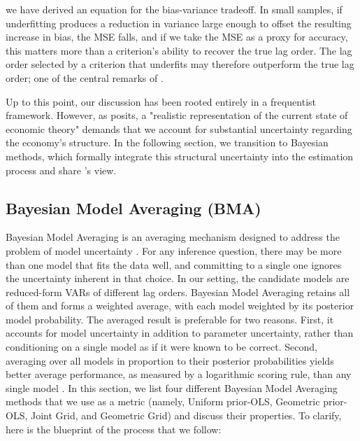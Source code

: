 \documentclass[12pt, a4paper]{article}
\begin{document}
we have derived an equation for the bias-variance tradeoff. In small samples, if underfitting produces a reduction in variance large enough to offset the resulting increase in bias, the MSE falls, and if we take the MSE as a proxy for accuracy, this matters more than a criterion's ability to recover the true lag order. The lag order selected by a criterion that underfits may therefore outperform the true lag order; one of the central remarks of \citet{ivanovPractitionersGuideLag2005}.

Up to this point, our discussion has been rooted entirely in a frequentist framework. However, as \citet{littermanForecastingBayesianVector1986} posits, a "realistic representation of the current state of economic theory" demands that we account for substantial uncertainty regarding the economy's structure. In the following section, we transition to Bayesian methods, which formally integrate this structural uncertainty into the estimation process and share \citet{littermanForecastingBayesianVector1986}'s view.

\subsection{Bayesian Model Averaging (BMA)}
\label{sec:bma}

Bayesian Model Averaging is an averaging mechanism designed to address the problem of model uncertainty \citep{hoetingBayesianModelAveraging1999, steelModelAveragingIts2020}. For any inference question, there may be more than one model that fits the data well, and committing to a single one ignores the uncertainty inherent in that choice. In our setting, the candidate models are reduced-form VARs of different lag orders. Bayesian Model Averaging retains all of them and forms a weighted average, with each model weighted by its posterior model probability. The averaged result is preferable for two reasons. First, it accounts for model uncertainty in addition to parameter uncertainty, rather than conditioning on a single model as if it were known to be correct. Second, averaging over all models in proportion to their posterior probabilities yields better average performance, as measured by a logarithmic scoring rule, than any single model \citep{madiganModelSelectionAccounting1994,hoetingBayesianModelAveraging1999}. In this section, we list four different Bayesian Model Averaging methods that we use as a metric (namely, Uniform prior-OLS, Geometric prior-OLS, Joint Grid, and Geometric Grid) and discuss their properties. To clarify, here is the blueprint of the process that we follow:
\end{document}

